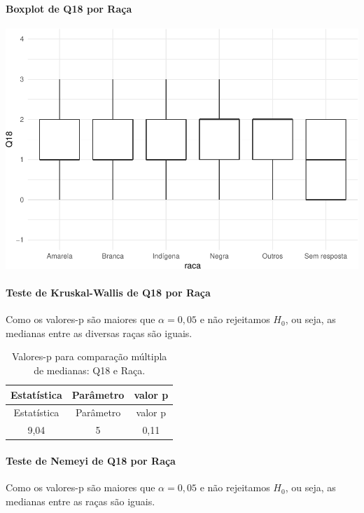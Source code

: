 \documentclass[]{article}
\let\oldparagraph\paragraph
\renewcommand{\paragraph}[1]{\oldparagraph{#1}\mbox{}}
\begin{document}
\hypertarget{boxplot-de-q18-por-rauxe7a}{%
\paragraph{Boxplot de Q18 por Raça}\label{boxplot-de-q18-por-rauxe7a}}

\begin{center}\includegraphics[width=0.75\linewidth]{relatorio_files/figure-latex/unnamed-chunk-244-1} \end{center}

\hypertarget{teste-de-kruskal-wallis-de-q18-por-rauxe7a}{%
\paragraph{Teste de Kruskal-Wallis de Q18 por Raça}\label{teste-de-kruskal-wallis-de-q18-por-rauxe7a}}

Como os valores-p são maiores que \(\alpha=0,05\) e não rejeitamos \(H_0\), ou seja, as medianas entre as diversas raças são iguais.

\begin{longtable}[]{@{}ccc@{}}
\caption{\label{tab:unnamed-chunk-245}Valores-p para comparação múltipla de medianas: Q18 e Raça.}\tabularnewline
\toprule
Estatística & Parâmetro & valor p\tabularnewline
\midrule
\endfirsthead
\toprule
Estatística & Parâmetro & valor p\tabularnewline
\midrule
\endhead
9,04 & 5 & 0,11\tabularnewline
\bottomrule
\end{longtable}

\hypertarget{teste-de-nemeyi-de-q18-por-rauxe7a}{%
\paragraph{Teste de Nemeyi de Q18 por Raça}\label{teste-de-nemeyi-de-q18-por-rauxe7a}}

Como os valores-p são maiores que \(\alpha=0,05\) e não rejeitamos \(H_0\), ou seja, as medianas entre as raças são iguais.
\end{document}

